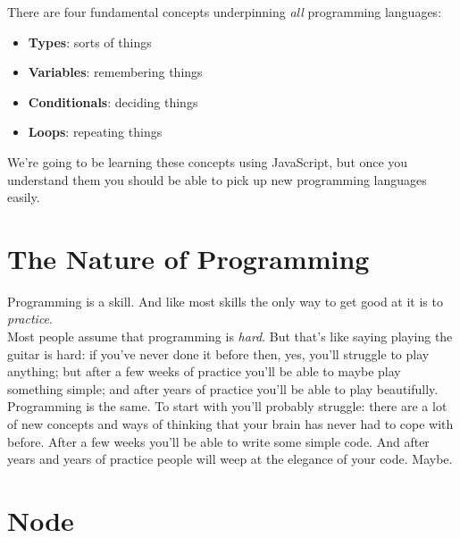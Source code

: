 
There are four fundamental concepts underpinning \textit{all} programming languages:

\begin{itemize}
    \item \textbf{Types}: sorts of things
    \item \textbf{Variables}: remembering things
    \item \textbf{Conditionals}: deciding things
    \item \textbf{Loops}: repeating things
\end{itemize}

We're going to be learning these concepts using JavaScript, but once you understand them you should be able to pick up new programming languages easily.

\pagebreak

\section{The Nature of Programming}


Programming is a skill. And like most skills the only way to get good at it is to \textit{practice}.
\\

Most people assume that programming is \textit{hard}. But that's like saying playing the guitar is hard: if you've never done it before then, yes, you'll struggle to play anything; but after a few weeks of practice you'll be able to maybe play something simple; and after years of practice you'll be able to play beautifully.
\\

Programming is the same. To start with you'll probably struggle: there are a lot of new concepts and ways of thinking that your brain has never had to cope with before. After a few weeks you'll be able to write some simple code. And after years and years of practice people will weep at the elegance of your code. Maybe.


\section{Node}

